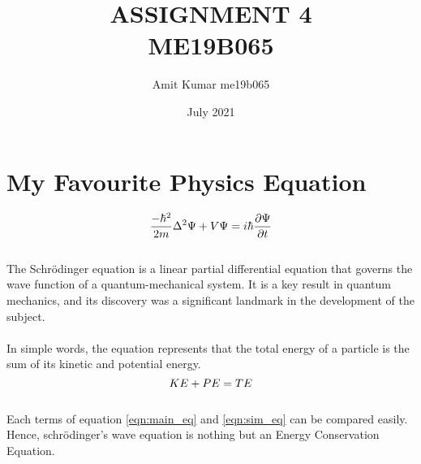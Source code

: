 \documentclass{article}
\title{%
ASSIGNMENT 4\\
ME19B065}
\author{Amit Kumar me19b065}
\date{July 2021}
\begin{document}
\maketitle

\section{My Favourite Physics Equation}
\hspace{6mm}
\begin{equation}
\label{eqn:main_eq}
\Large
      \frac{-\hbar^2}{2m}\Delta^2{\Psi} + V\Psi = i\hbar{\frac{\partial \Psi}{\partial t}}
\end{equation}
\\
The Schrödinger equation is a linear partial differential equation that governs the wave function of a quantum-mechanical system. It is a key result in quantum mechanics, and its discovery was a significant landmark in the development of the subject.
\\
\\
In simple words, the equation represents that the total energy of a particle is the sum of its kinetic and potential energy. \\
\begin{equation}
\label{eqn:sim_eq}
\Large
    KE+PE=TE
\end{equation}
\\
Each terms of equation \ref{eqn:main_eq} and \ref{eqn:sim_eq} can be compared easily. Hence, schrödinger's wave equation is nothing but an Energy Conservation Equation.
\end{document}
